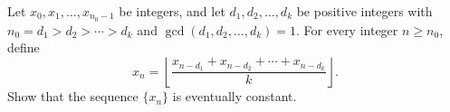 Let $x_0, x_1, \dots , x_{n_0-1}$ be integers, and let $d_1, d_2, \dots, d_k$ be positive integers with $n_0 = d_1 > d_2 > \cdots > d_k$ and $\gcd (d_1, d_2, \dots , d_k) = 1$. For every integer $n \ge n_0$, define \[x_n = \left\lfloor{\frac{x_{n-d_1} + x_{n-d_2} + \cdots + x_{n-d_k}}{k}}\right\rfloor.\] Show that the sequence $\{x_n\}$ is eventually constant.